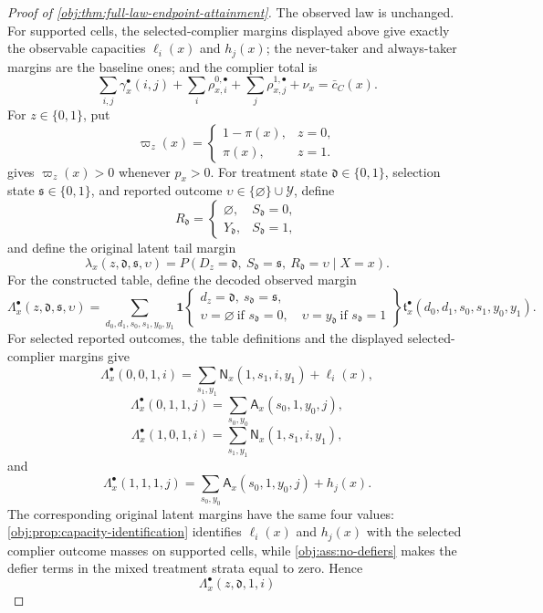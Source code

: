 \begin{proof}[Proof of \cref{obj:thm:full-law-endpoint-attainment}]
The observed law is unchanged.  For supported cells, the selected-complier margins displayed above give exactly the observable capacities \(\ell_i(x)\) and \(h_j(x)\); the never-taker and always-taker margins are the baseline ones; and the complier total is
\[
\sum_{i,j}\gamma^\bullet_x(i,j)
+\sum_i\rho^{0,\bullet}_{x,i}
+\sum_j\rho^{1,\bullet}_{x,j}
+\nu_x
=
\bar c_C(x).
\]
For \(z\in\{0,1\}\), put
\[
\varpi_z(x)=
\begin{cases}
1-\pi(x),& z=0,\\
\pi(x),& z=1.
\end{cases}
\]
 gives \(\varpi_z(x)>0\) whenever \(p_x>0\).  For treatment state \(\mathfrak d\in\{0,1\}\), selection state \(\mathfrak s\in\{0,1\}\), and reported outcome \(\upsilon\in\{\varnothing\}\cup\mathcal Y\), define
\[
R_{\mathfrak d}
=
\begin{cases}
\varnothing,& S_{\mathfrak d}=0,\\
Y_{\mathfrak d},& S_{\mathfrak d}=1,
\end{cases}
\]
and define the original latent tail margin
\[
\lambda_x(z,\mathfrak d,\mathfrak s,\upsilon)
=
P\!\left(D_z=\mathfrak d,\ S_{\mathfrak d}=\mathfrak s,\ R_{\mathfrak d}=\upsilon\mid X=x\right).
\]
For the constructed table, define the decoded observed margin
\[
\Lambda^\bullet_x(z,\mathfrak d,\mathfrak s,\upsilon)
=
\sum_{d_0,d_1,s_0,s_1,y_0,y_1}
\mathbf 1\!
\left\{
\begin{array}{c}
 d_z=\mathfrak d,\ s_{\mathfrak d}=\mathfrak s,\\
 \upsilon=\varnothing\ \text{if }s_{\mathfrak d}=0,\quad
 \upsilon=y_{\mathfrak d}\ \text{if }s_{\mathfrak d}=1
\end{array}
\right\}
\mathfrak t^\bullet_x(d_0,d_1,s_0,s_1,y_0,y_1).
\]
For selected reported outcomes, the table definitions and the displayed selected-complier margins give
\[
\Lambda^\bullet_x(0,0,1,i)
=
\sum_{s_1,y_1}\mathsf N_x(1,s_1,i,y_1)+\ell_i(x),
\]
\[
\Lambda^\bullet_x(0,1,1,j)
=
\sum_{s_0,y_0}\mathsf A_x(s_0,1,y_0,j),
\]
\[
\Lambda^\bullet_x(1,0,1,i)
=
\sum_{s_1,y_1}\mathsf N_x(1,s_1,i,y_1),
\]
and
\[
\Lambda^\bullet_x(1,1,1,j)
=
\sum_{s_0,y_0}\mathsf A_x(s_0,1,y_0,j)+h_j(x).
\]
The corresponding original latent margins have the same four values: \cref{obj:prop:capacity-identification} identifies \(\ell_i(x)\) and \(h_j(x)\) with the selected complier outcome masses on supported cells, while \cref{obj:ass:no-defiers} makes the defier terms in the mixed treatment strata equal to zero.  Hence
\[
\Lambda^\bullet_x(z,\mathfrak d,1,i)
\]
\end{proof}
